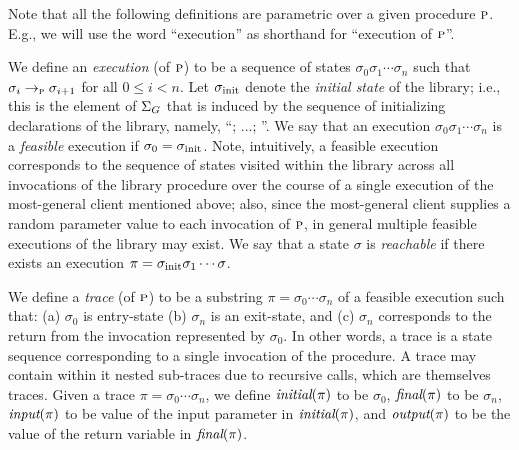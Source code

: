Note that all the following definitions are parametric over a given procedure $\textsc{p}$.
E.g., we will use the word ``execution'' as shorthand for ``execution of $\textsc{p}$''.

We define an \emph{execution} (of $\textsc{p}$) to be a sequence of states $\sigma_0 \sigma_1 \cdots \sigma_n$ such that
$\sigma_i \rightarrow_{\textsc{p}} \sigma_{i+1}$ for all $0 \leq i < n$.
Let $\sigma_{\text{init}}$ denote the \emph{initial state} of the library; i.e., this
is the element of $\Sigma_G$ that is induced by the sequence of initializing declarations of
the library, namely, ``;
$\ldots$; ''.
We say that an execution $\sigma_0 \sigma_1 \cdots \sigma_n$ is a
\emph{feasible} execution if $\sigma_0 = \sigma_{\text{init}}$. Note, 
intuitively, a feasible execution  corresponds to the sequence
of states visited within the library across all invocations of
the library procedure over the course of a single execution of
the most-general client mentioned above; also, since the most-general client
supplies a random parameter value to each invocation of $\textsc{p}$, in general
multiple feasible executions of the library may exist.
We say that a state $\sigma$ is \emph{ reachable} if there exists an execution $\pi = \sigma_{\text{init}} \sigma_1 \cdots \sigma$.


We define a \emph{trace} (of $\textsc{p}$) to be a substring 
 $\pi = \sigma_0 \cdots \sigma_n$ of a feasible execution such that:
 (a) $\sigma_0$ is entry-state
 (b) $\sigma_n$ is an exit-state, and
 (c) $\sigma_n$ corresponds to the return from the invocation represented
by $\sigma_0$.
In other words, a trace is a state sequence corresponding to a single
invocation of the procedure. A trace may contain within it nested
sub-traces due to recursive calls, which are themselves traces.
Given a trace $\pi = \sigma_0 \cdots \sigma_n$, we define
$\textit{initial}(\pi)$ to be $\sigma_0$,
$\textit{final}(\pi)$ to be $\sigma_n$,
$\textit{input}(\pi)$ to be value of the input parameter in $\textit{initial}(\pi)$,
and $\textit{output}(\pi)$ to be the value of the return variable in $\textit{final}(\pi)$.

